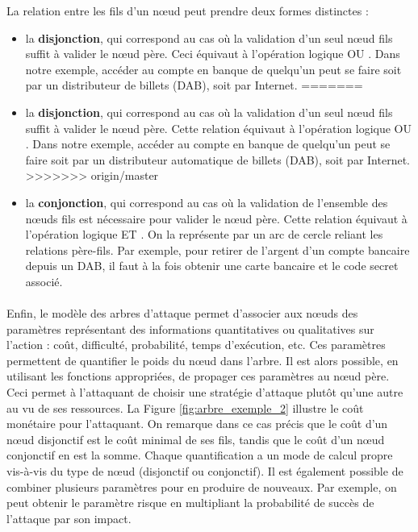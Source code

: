         La relation entre les fils d'un nœud peut prendre deux formes distinctes :
        \begin{itemize}
<<<<<<< HEAD
            \item la {\bf disjonction}, qui correspond au cas où la validation d'un seul nœud fils suffit à valider le nœud père. Ceci équivaut à l'opération logique \og OU \fg{}. Dans notre exemple, accéder au compte en banque de quelqu'un peut se faire soit par un distributeur de billets (DAB), soit par Internet.
=======
            \item la {\bf disjonction}, qui correspond au cas où la validation d'un seul nœud fils suffit à valider le nœud père. Cette relation équivaut à l'opération logique \og OU \fg{}. Dans notre exemple, accéder au compte en banque de quelqu'un peut se faire soit par un distributeur automatique de billets (DAB), soit par Internet.
>>>>>>> origin/master
            
            \item la {\bf conjonction}, qui correspond au cas où la validation de l'ensemble des nœuds fils est nécessaire pour valider le nœud père. Cette relation équivaut à l'opération logique \og ET \fg{}. On la représente par un arc de cercle reliant les relations père-fils. Par exemple, pour retirer de l'argent d'un compte bancaire depuis un DAB, il faut à la fois obtenir une carte bancaire et le code secret associé.
        \end{itemize} 
	

	\paragraph{}

        Enfin, le modèle des arbres d'attaque permet d'associer aux nœuds des paramètres représentant des informations quantitatives ou qualitatives sur l'action : coût, difficulté, probabilité, temps d'exécution, etc. Ces paramètres permettent de quantifier le poids du nœud dans l'arbre. Il est alors possible, en utilisant les fonctions appropriées, de propager ces paramètres au nœud père. Ceci permet à l'attaquant de choisir une stratégie d'attaque plutôt qu'une autre au vu de ses ressources. La Figure \ref{fig:arbre_exemple_2} illustre le coût monétaire pour l'attaquant. On remarque dans ce cas précis que le coût d'un nœud disjonctif est le coût minimal de ses fils, tandis que le coût d'un nœud conjonctif en est la somme. Chaque quantification a un mode de calcul propre vis-à-vis du type de nœud (disjonctif ou conjonctif). Il est également possible de combiner plusieurs paramètres pour en produire de nouveaux. Par exemple, on peut obtenir le paramètre \og risque \fg{}  en multipliant la \og probabilité de succès\fg{} de l'attaque par son \og impact\fg{}.

